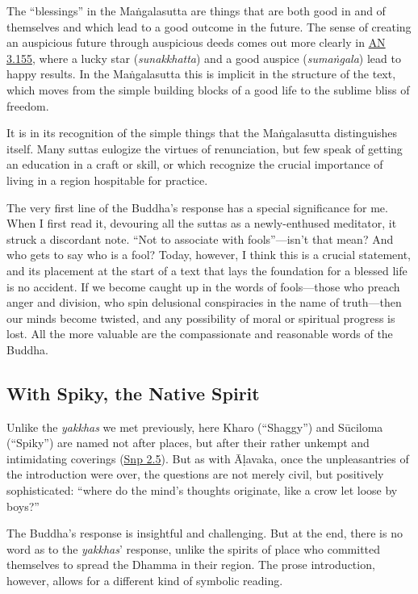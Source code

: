 \documentclass[12pt,openany]{book}%
\begin{document}
The “blessings” in the \textsanskrit{Maṅgalasutta} are things that are both good in and of themselves and which lead to a good outcome in the future. The sense of creating an auspicious future through auspicious deeds comes out more clearly in \href{https://suttacentral.net/an3.155/en/sujato}{AN 3.155}, where a lucky star (\textit{sunakkhatta}) and a good auspice (\textit{\textsanskrit{sumaṅgala}}) lead to happy results. In the \textsanskrit{Maṅgalasutta} this is implicit in the structure of the text, which moves from the simple building blocks of a good life to the sublime bliss of freedom.

It is in its recognition of the simple things that the \textsanskrit{Maṅgalasutta} distinguishes itself. Many suttas eulogize the virtues of renunciation, but few speak of getting an education in a craft or skill, or which recognize the crucial importance of living in a region hospitable for practice.

The very first line of the Buddha’s response has a special significance for me. When I first read it, devouring all the suttas as a newly-enthused meditator, it struck a discordant note. “Not to associate with fools”—isn’t that mean? And who gets to say who is a fool? Today, however, I think this is a crucial statement, and its placement at the start of a text that lays the foundation for a blessed life is no accident. If we become caught up in the words of fools—those who preach anger and division, who spin delusional conspiracies in the name of truth—then our minds become twisted, and any possibility of moral or spiritual progress is lost. All the more valuable are the compassionate and reasonable words of the Buddha.

\subsection*{With Spiky, the Native Spirit}

Unlike the \textit{yakkhas} we met previously, here Kharo (“Shaggy”) and \textsanskrit{Sūciloma} (“Spiky”) are named not after places, but after their rather unkempt and intimidating coverings (\href{https://suttacentral.net/snp2.5/en/sujato}{Snp 2.5}). But as with \textsanskrit{Āḷavaka}, once the unpleasantries of the introduction were over, the questions are not merely civil, but positively sophisticated: “where do the mind’s thoughts originate, like a crow let loose by boys?”

The Buddha’s response is insightful and challenging. But at the end, there is no word as to the \textit{yakkhas}’ response, unlike the spirits of place who committed themselves to spread the Dhamma in their region. The prose introduction, however, allows for a different kind of symbolic reading.
\end{document}
